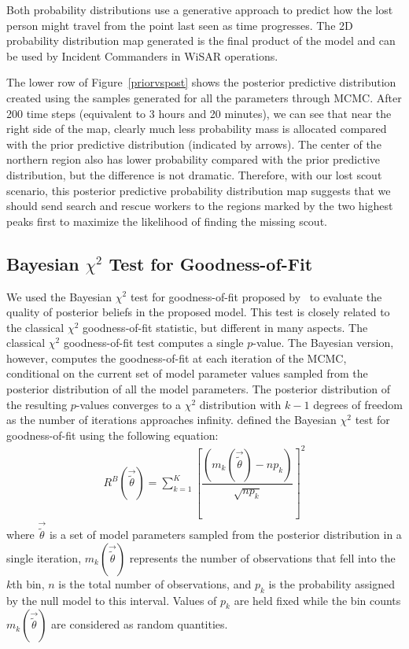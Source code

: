 Both probability distributions use a generative approach to predict how the lost person might travel from the point last seen as time progresses. The 2D probability distribution map generated is the final product of the model and can be used by Incident Commanders in WiSAR operations.

The lower row of Figure~\ref{priorvspost} shows the posterior predictive distribution created using the samples generated for all the parameters through MCMC. After 200 time steps (equivalent to 3 hours and 20 minutes), we can see that near the right side of the map, clearly much less probability mass is allocated compared with the prior predictive distribution (indicated by arrows). The center of the northern region also has lower probability compared with the prior predictive distribution, but the difference is not dramatic. Therefore, with our lost scout scenario, this posterior predictive probability distribution map suggests that we should send search and rescue workers to the regions marked by the two highest peaks first to maximize the likelihood of finding the missing scout.

\subsection{Bayesian \texorpdfstring{$\chi^2$}{Chi-squared} Test for Goodness-of-Fit}
\label{sec:4.5}

We used the Bayesian $\chi^2$ test for goodness-of-fit proposed by~\cite{Johnson2004Bayesian} to evaluate the  quality of posterior beliefs in the proposed model. This test is closely related to the classical $\chi^2$ goodness-of-fit statistic, but different in many aspects. The classical $\chi^2$ goodness-of-fit test computes a single $p$-value. The Bayesian version, however, computes the goodness-of-fit at each iteration of the MCMC, conditional on the current set of model parameter values sampled from the posterior distribution of all the model parameters. The posterior distribution of the resulting $p$-values converges to a $\chi^2$ distribution with $k-1$ degrees of freedom as the number of iterations approaches infinity. \cite{Johnson2004Bayesian} defined the Bayesian $\chi^2$ test for goodness-of-fit using the following equation:
\begin{align}
R^B(\vec{\tilde{\theta}}) = \sum_{k=1}^K {\left [\dfrac{(m_k(\vec{\tilde{\theta}})-n p_k)}{\sqrt{n p_k}}\right ]}^2
\end{align}
where $\vec{\tilde{\theta}}$ is a set of model parameters sampled from the posterior distribution in a single iteration, $m_k(\vec{\tilde{\theta}})$ represents the number of observations that fell into the $k$th bin, $n$ is the total number of observations, and $p_k$ is the probability assigned by the null model to this interval. Values of $p_k$ are held fixed while the bin counts $m_k(\vec{\tilde{\theta}})$ are considered as random quantities.

